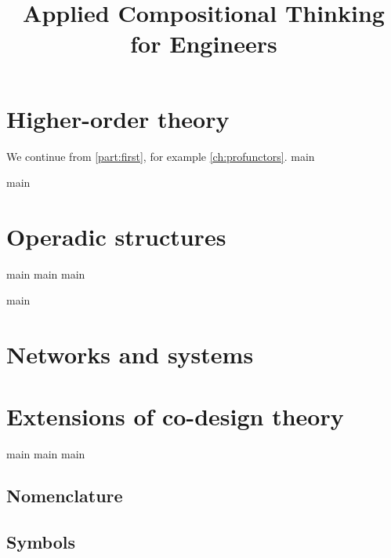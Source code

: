 \pagestyle{scrheadings}

\ohead{\pagemark}
\ihead{\headmark}
\cfoot{}
\dominitoc
\doparttoc
\setcounter{parttocdepth}{0}
\setcounter{minitocdepth}{1}

\title{Applied Compositional Thinking\\ for Engineers}
\date{}


\tableofcontents

\addtocounter{part}{5}
\addtocounter{chapter}{37}


\part{Higher-order theory}\label{part:higher-order}


We continue from \cref{part:first},
for example \cref{ch:profunctors}.
{main}

{main}


\part{Operadic structures}\label{part:operads}

{main}
{main}
{main}

{main}


\part{Networks and systems}\label{part:networks}


\chapter{}


\part{Extensions of co-design theory}
{main}
{main}
{main}


\printbibliography

\chapter*{Nomenclature}
\begin{small}

\end{small}

\printindex




\chapter*{Symbols}
\footnotesize

\normalsize
